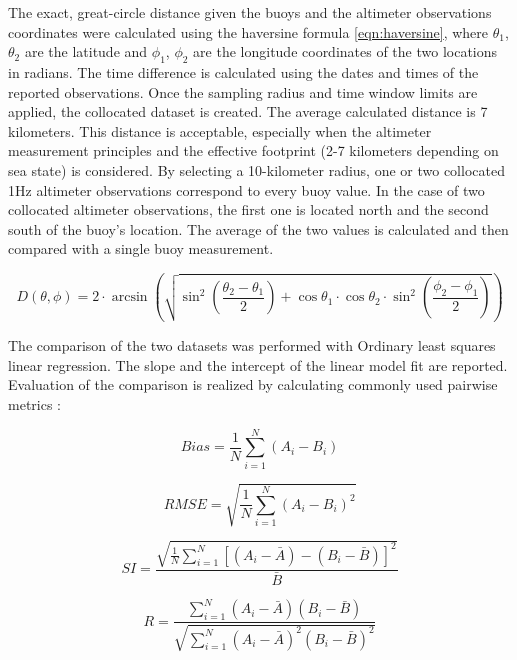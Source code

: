 The exact, great-circle distance given the buoys and the altimeter observations coordinates were calculated using the haversine formula \ref{eqn:haversine}, where $\theta_{1}$, $\theta_{2}$ are the latitude and $\phi_{1}$, $\phi_{2}$ are the longitude coordinates of the two locations in radians. The time difference is calculated using the dates and times of the reported observations. Once the sampling radius and time window limits are applied, the collocated dataset is created. The average calculated distance is 7 kilometers. This distance is acceptable, especially when the altimeter measurement principles and the effective footprint (2-7 kilometers depending on sea state) is considered. By selecting a 10-kilometer radius, one or two collocated 1Hz altimeter observations correspond to every buoy value. In the case of two collocated altimeter observations, the first one is located north and the second south of the buoy's location. The average of the two values is calculated and then compared with a single buoy measurement. 


\begin{equation}
D(\theta,\phi) = 2 \cdot \arcsin{\left(\sqrt{\sin^{2}{\left(\frac{\theta_{2}-\theta_{1}}{2}\right)} + \cos{\theta_{1}} \cdot \cos{\theta_{2}} \cdot \sin^{2}{\left(\frac{\phi_{2}-\phi_{1}}{2}\right)}}\right)}
\label{eqn:haversine}
\end{equation}


The comparison of the two datasets was performed with Ordinary least squares linear regression. The slope and the intercept of the linear model fit are reported. Evaluation of the comparison is realized by calculating commonly used pairwise metrics \cite{Durrant2009, Yang2019} :


\begin{equation}
Bias = \frac{1}{N} \sum_{i=1}^{N} \left(A_{i}-B_{i}\right)
\label{eqn:bias}
\end{equation}

\begin{equation}
RMSE = \sqrt{\frac{1}{N} \sum_{i=1}^{N} \left(A_{i}-B_{i}\right)^2}
\label{eqn:rmse}
\end{equation}

\begin{equation}
SI = \frac{\sqrt{\frac{1}{N} \sum_{i=1}^{N} \left[ \left(A_{i}-\bar{A}\right) - \left(B_{i}-\bar{B}\right) \right]^2 }}{\bar{B}}
\label{eqn:scatter_index}
\end{equation}

\begin{equation}
R = \frac{\sum_{i=1}^{N} \left(A_{i}-\bar{A}\right) \left(B_{i}-\bar{B}\right) }{\sqrt{ \sum_{i=1}^{N}  \left(A_{i}-\bar{A}\right)^2 \left(B_{i}-\bar{B}\right)^2}}
\label{eqn:correlation}
\end{equation}

